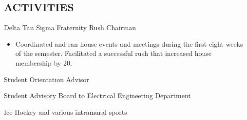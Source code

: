 \begin{resume}
 
\section{ACTIVITIES}      Delta Tau Sigma Fraternity Rush Chairman 
                    \begin{itemize} %
                    \item[] Coordinated and ran house events and meetings 
                    during the first eight weeks of the semester. 
                    Facilitated a successful rush that increased 
                    house membership by 20. 
                    \end{itemize}
                Student Orientation Advisor 
 
                Student Advisory Board to Electrical Engineering 
                Department 

                Ice Hockey and various intramural sports 

\end{resume} 






